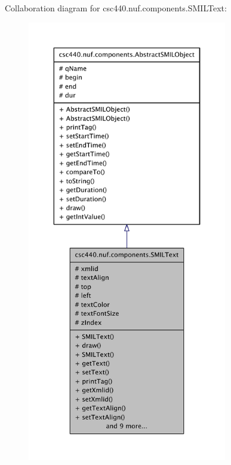 Collaboration diagram for csc440.\-nuf.\-components.\-S\-M\-I\-L\-Text\-:
\nopagebreak
\begin{figure}[H]
\begin{center}
\leavevmode
\includegraphics[height=550pt]{classcsc440_1_1nuf_1_1components_1_1_s_m_i_l_text__coll__graph}
\end{center}
\end{figure}
